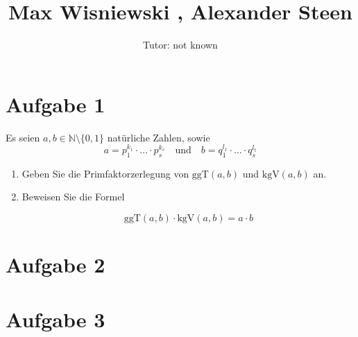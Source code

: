 \documentclass[11pt,a4paper,ngerman]{article}
\author{Tutor: not known}
\date{}
\title{Max Wisniewski , Alexander Steen}
\newcommand{\N}{\mathbb{N}}
\newcommand{\ggT}{\text{ggT}}
\newcommand{\kgV}{\text{kgV}}
\begin{document}

\maketitle
\thispagestyle{fancy}


\section*{Aufgabe 1}

Es seien $a,b \in \N \setminus \{ 0,1 \}$ natürliche Zahlen, sowie
$$
a= p_1^{k_1}\cdot ...\cdot p_s^{k_s} \quad \text{und} \quad b = q_1^{l_1} \cdot ... \cdot q_s^{l_t}
$$
\begin{enumerate}[\bfseries a)]

\item Geben Sie die Primfaktorzerlegung von $\ggT (a,b)$ und $\kgV (a,b)$ an.\\

\item Beweisen Sie die Formel

$$
\ggT (a,b) \cdot \kgV (a,b) = a \cdot b
$$

\end{enumerate}
\section*{Aufgabe 2}

\section*{Aufgabe 3}

\label{LastPage}
\end{document}
